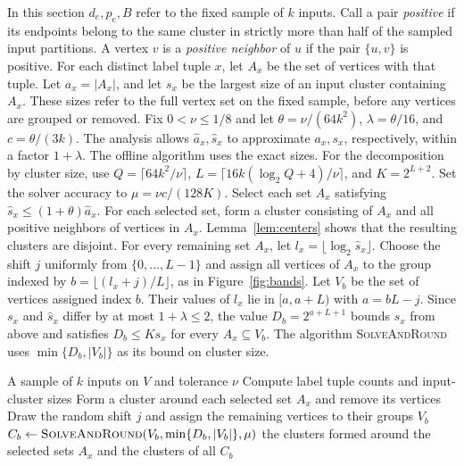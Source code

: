 \documentclass[11pt]{article}
\newcommand{\BandSeed}{\textup{\textsc{SolveAndRound}}}
\newcommand{\SampleSolve}{\textsc{Cluster}}
\begin{document}
In this section $d_e,p_e,B$ refer to the fixed sample of $k$ inputs.
Call a pair \emph{positive} if its endpoints belong to the same cluster in
strictly more than half of the sampled input partitions. A vertex $v$
is a \emph{positive neighbor} of $u$ if the pair $\{u,v\}$ is positive.
For each distinct label tuple $x$, let $A_x$ be the set of vertices
with that tuple. Let $a_x=|A_x|$, and let $s_x$ be the largest size of
an input cluster containing $A_x$. These sizes refer to the full vertex set on the fixed
sample, before any vertices are grouped or removed. Fix $0<\nu\le1/8$
and let $\theta=\nu/(64k^2)$, $\lambda=\theta/16$, and $c=\theta/(3k)$.
The analysis allows $\widehat a_x,\widehat s_x$ to approximate $a_x,s_x$,
respectively, within a factor $1+\lambda$. The offline algorithm
uses the exact sizes.
For the decomposition by cluster size, use $Q=\lceil64k^2/\nu\rceil$,
$L=\lceil16k(\log_2 Q+4)/\nu\rceil$, and $K=2^{L+2}$.
Set the solver accuracy to $\mu=\nu c/(128K)$.
Select each set $A_x$ satisfying
$\widehat s_x\le(1+\theta)\widehat a_x$. For each selected set, form
a cluster consisting of $A_x$ and all positive neighbors of vertices in
$A_x$.
Lemma~\ref{lem:centers} shows that the resulting clusters are disjoint. For every remaining set $A_x$, let
$l_x=\lfloor\log_2\widehat s_x\rfloor$. Choose the shift $j$ uniformly
from $\{0,\ldots,L-1\}$ and assign all vertices of $A_x$ to the group
indexed by $b=\lfloor(l_x+j)/L\rfloor$, as in Figure~\ref{fig:bands}.
Let $V_b$ be the set of vertices assigned index $b$. Their values of
$l_x$ lie in $[a,a+L)$
with $a=bL-j$. Since $s_x$ and $\widehat s_x$ differ by at most
$1+\lambda\le2$, the value $D_b=2^{a+L+1}$ bounds $s_x$ from above
and satisfies $D_b\le K s_x$ for every $A_x\subseteq V_b$. The algorithm \BandSeed{}
uses $\min\{D_b,|V_b|\}$ as its bound on cluster size.

\begin{algorithm}[htbp]
\caption{\SampleSolve\ on fixed input partitions}
\label{alg:offline}
\begin{algorithmic}[1]
\Require A sample of $k$ inputs on $V$ and tolerance $\nu$
\State Compute label tuple counts and input-cluster sizes
\State Form a cluster around each selected set $A_x$ and remove its vertices
\State Draw the random shift $j$ and assign the remaining vertices to their groups $V_b$
    \State $C_b\gets \BandSeed(V_b,\min\{D_b,|V_b|\},\mu)$
\EndFor
\State \Return the clusters formed around the selected sets $A_x$ and the clusters of all $C_b$
\end{algorithmic}
\end{algorithm}
\end{document}
